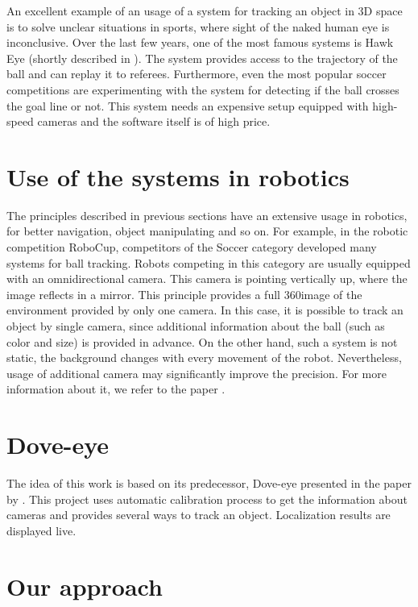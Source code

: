 An excellent example of an usage of a system for tracking an object in 3D space
is to solve unclear situations in sports, where sight of the naked human
eye is inconclusive. Over the last few years, one of the most famous systems is
Hawk Eye (shortly described in \citet*{owens2003hawk}). The system provides
access to the trajectory of the ball and can replay it to referees.
Furthermore, even the most popular soccer competitions are experimenting with
the system for detecting if the ball crosses the goal line or not.  This system needs
an expensive setup equipped with high-speed cameras and the software itself is of
high price.

\section{Use of the systems in robotics}

The principles described in previous sections have an extensive usage in
robotics, for better navigation, object manipulating and so on. For example, in
the robotic competition RoboCup, competitors of the Soccer category developed
many systems for ball tracking. Robots competing in this category are usually
equipped with an omnidirectional camera.  This camera is pointing vertically
up, where the image reflects in a mirror.  This principle provides a full
360\degree image of the environment provided by only one camera. In this case,
it is possible to track an object by single camera, since additional
information about the ball (such as color and size) is provided in advance. On
the other hand, such a system is not static, the background changes with every
movement of the robot. Nevertheless, usage of additional camera may
significantly improve the precision. For more information about it, we refer to
the paper \citet*{kappeler20103d}.


\section{Dove-eye}

The idea of this work is based on its predecessor, Dove-eye presented in the
paper by \citet*{dove-eye}. This project uses automatic calibration process to
get the information about cameras and provides several ways to track an
object. Localization results are displayed live.

\section{Our approach}

